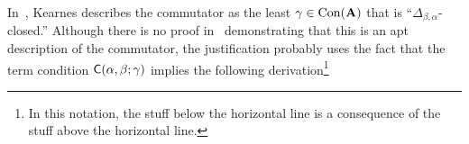 In~\cite[p.~930]{MR1358491}, Kearnes describes the 
commutator as the least $\gamma\in \operatorname{Con} (\mathbf{A})$ that is ``$\Delta_{\beta,\alpha}$-closed.''
Although there is no proof in~\cite[p.~930]{MR1358491} demonstrating that this
is an apt description of the commutator, the justification probably uses
the fact that the term condition
$\mathsf{C}(\alpha, \beta; \gamma)$ implies 
the following derivation\footnote{In this notation, the stuff below the horizontal line
  is a consequence of the stuff above the horizontal line.}
